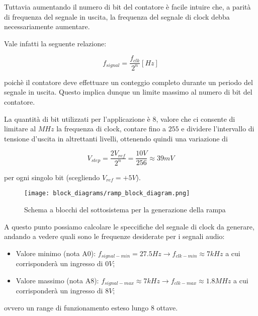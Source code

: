 Tuttavia aumentando il numero di bit del contatore è facile intuire che, a parità di
frequenza del segnale in uscita, la frequenza del segnale di clock debba necessariamente
aumentare.

Vale infatti la seguente relazione:

\begin{displaymath}
    f_{signal}=\frac{f_{clk}}{2^n}[Hz]
\end{displaymath}

poichè il contatore deve effettuare un conteggio completo durante un periodo del segnale
in uscita. Questo implica dunque un limite massimo al numero di bit del contatore.

La quantità di bit utilizzati per l'applicazione è $8$, valore che ci consente di limitare
al $MHz$ la frequenza di clock, contare fino a $255$ e dividere l'intervallo di tensione
d'uscita in altrettanti livelli, ottenendo quindi una variazione di

\begin{displaymath}
    V_{step}=\frac{2V_{ref}}{2^n}=\frac{10V}{256}\approx39mV
\end{displaymath}


per ogni singolo bit (scegliendo $V_{ref}=+5V$).
\medskip

\begin{figure}[ht]
    \centering
    \texttt{[image: block\_diagrams/ramp\_block\_diagram.png]}
    \caption{Schema a blocchi del sottosistema per la generazione della rampa}
    \label{ramp_block_diagram}
\end{figure}

A questo punto possiamo calcolare le speccifiche del segnale di clock da generare,
andando a vedere quali sono le frequenze desiderate per i segnali audio:

\begin{itemize}
    \item Valore minimo (nota A0): $f_{signal-min}=27.5Hz\rightarrow f_{clk-min}\approx7kHz$
          a cui corrisponderà un ingresso di $0V$;
    \item Valore massimo (nota A8): $f_{signal-max}\approx7kHz\rightarrow f_{clk-max}\approx1.8MHz$
          a cui corrisponderà un ingresso di $8V$;
\end{itemize}

ovvero un range di funzionamento esteso lungo 8 ottave.


